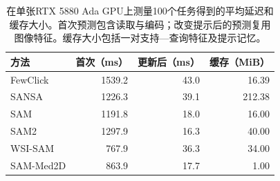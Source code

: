 \begin{table}[t]
\centering
\caption{在单张RTX 5880 Ada GPU上测量100个任务得到的平均延迟和缓存大小。首次预测包含读取与编码；改变提示后的预测复用图像特征。缓存大小包括一对支持—查询特征及提示记忆。}
\label{tab:efficiency}
\small
\setlength{\tabcolsep}{4pt}
\begin{tabular}{@{}lrrr@{}}
\toprule
方法 & 首次（ms） & 更新后（ms） & 缓存（MiB） \\
\midrule
FewClick & 1539.2 & 43.0 & 16.39 \\
SANSA & 1226.3 & 39.1 & 212.38 \\
SAM & 1191.8 & 18.0 & 16.00 \\
SAM2 & 1297.9 & 16.3 & 40.00 \\
WSI-SAM & 767.9 & 36.3 & 34.00 \\
SAM-Med2D & 863.9 & 17.7 & 1.00 \\
\bottomrule
\end{tabular}
\end{table}
